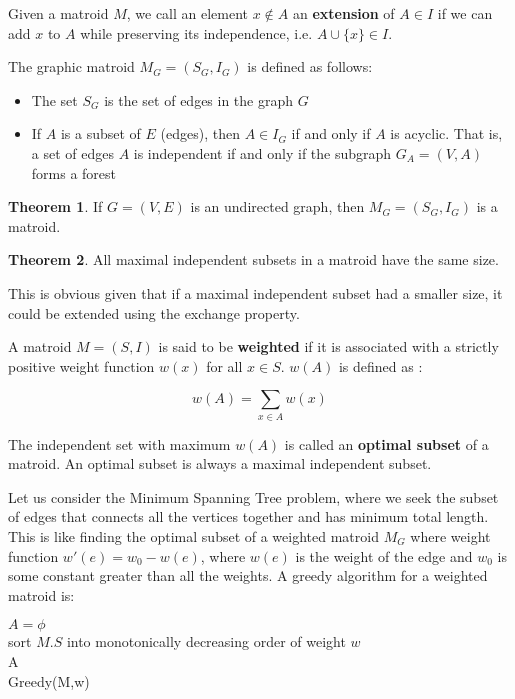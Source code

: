 \documentclass[12pt,letterpaper]{article}
\theoremstyle{definition}
\newtheorem{theorem}{Theorem}[section] %
\begin{document}
Given a matroid $M$, we call an element $x \notin A$ an \textbf{extension} of $A \in I$ if we can add $x$ to $A$ while preserving its independence, i.e. $A \cup \{x\} \in I$. 

The graphic matroid $M_G = (S_G, I_G)$ is defined as follows:

\begin{itemize}
  \item The set $S_G$ is the set of edges in the graph $G$
  \item If $A$ is a subset of $E$ (edges), then $A \in I_G$ if and only if $A$ is acyclic. That is, a set of edges $A$ is independent if and only if the subgraph $G_A = (V,A)$ forms a forest
\end{itemize}

\begin{theorem}
  If $G = (V,E)$ is an undirected graph, then $M_G = (S_G,I_G)$ is a matroid.
\end{theorem}

\begin{theorem}
  All maximal independent subsets in a matroid have the same size.
\end{theorem}

This is obvious given that if a maximal independent subset had a smaller size, it could be extended using the exchange property.

A matroid $M = (S,I)$ is said to be \textbf{weighted} if it is associated with a strictly positive weight function $w(x)$ for all $x \in S$. $w(A)$ is defined as :

\[w(A) = \sum_{x \in A} w(x)\]

The independent set with maximum $w(A)$ is called an \textbf{optimal subset} of a matroid. An optimal subset is always a maximal independent subset.

Let us consider the Minimum Spanning Tree problem, where we seek the subset of edges that connects all the vertices together and has minimum total length. This is like finding the optimal subset of a weighted matroid $M_G$ where weight function $w'(e) = w_0 - w(e)$, where $w(e)$ is the weight of the edge and $w_0$ is some constant greater than all the weights. A greedy algorithm for a weighted matroid is:

\begin{algorithm}[H]
  \SetAlgoLined
  $A = \phi$ \\
  sort $M.S$ into monotonically decreasing order of weight $w$  \\
  \Return A \\
  \caption{Greedy(M,w)}
\end{algorithm}
\end{document}
